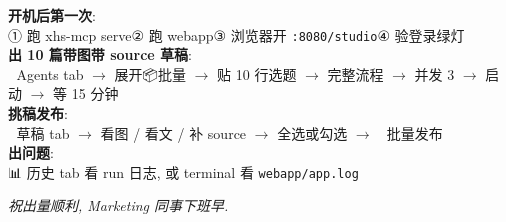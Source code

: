 \documentclass[11pt,a4paper]{article}
\begin{document}
\begin{tcolorbox}[colback=xhsBg, colframe=xhsRed, arc=3mm, breakable, title={\large\bfseries 日常一键出量 SOP}, fonttitle=\color{white}]
\textbf{开机后第一次}: \\
\quad ① 跑 xhs-mcp serve\quad ② 跑 webapp\quad ③ 浏览器开 \texttt{:8080/studio}\quad ④ 验登录绿灯
\\[6pt]
\textbf{出 10 篇带图带 source 草稿}:\\
\quad 🤖 Agents tab \(\to\) 展开📦批量 \(\to\) 贴 10 行选题 \(\to\) 完整流程 \(\to\) 并发 3 \(\to\) 启动 \(\to\) 等 15 分钟
\\[6pt]
\textbf{挑稿发布}:\\
\quad 📝 草稿 tab \(\to\) 看图 / 看文 / 补 source \(\to\) 全选或勾选 \(\to\) 🚀 批量发布
\\[6pt]
\textbf{出问题}:\\
\quad 📊 历史 tab 看 run 日志, 或 terminal 看 \texttt{webapp/app.log}
\end{tcolorbox}

\vspace{1cm}
\begin{center}
\textit{祝出量顺利, Marketing 同事下班早.}
\end{center}
\end{document}
